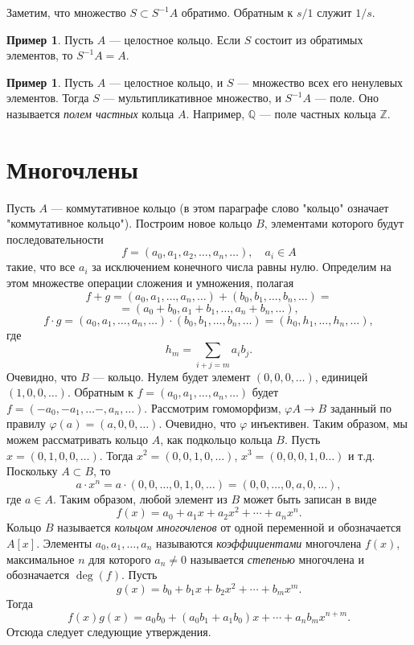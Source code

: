 \documentclass[12pt, titlepage, oneside]{amsbook}
\newcommand{\ZZ}{\mathbb{Z}}
\newcommand{\QQ}{\mathbb{Q}}
\theoremstyle{definition}
\newtheorem{example}[theorem]{Пример}
\theoremstyle{remark}
\begin{document}
Заметим, что множество $S\subset S^{-1}A$ обратимо. Обратным к $s/1$ служит $1/s$.

\begin{example}
	Пусть $A$ --- целостное кольцо. Если $S$ состоит из обратимых элементов, то $S^{-1}A=A$.
\end{example}

\begin{example}
	Пусть $A$ --- целостное кольцо, и $S$ --- множество всех его ненулевых элементов. Тогда $S$ --- мультипликативное множество, и $S^{-1}A$ --- поле. Оно называется \emph{полем частных} кольца $A$. Например, $\QQ$ --- поле частных кольца $\ZZ$.
\end{example}

\section{Многочлены}

Пусть $A$ --- коммутативное кольцо (в этом параграфе слово "кольцо" означает "коммутативное кольцо"). Построим новое кольцо $B$, элементами которого будут последовательности $$f=(a_0,a_1,a_2,\ldots,a_n,\ldots),\quad a_i\in A$$ такие, что все $a_i$ за исключением конечного числа равны нулю. Определим на этом множестве операции сложения и умножения, полагая $$f+g=(a_0,a_1,\ldots,a_n,\ldots)+(b_0,b_1,\ldots,b_n,\ldots)=$$ $$=(a_0+b_0,a_1+b_1,\ldots,a_n+b_n,\ldots),$$ $$f\cdot g=(a_0,a_1,\ldots,a_n,\ldots)\cdot(b_0,b_1,\ldots,b_n,\ldots)=(h_0,h_1,\ldots,h_n,\ldots),$$ где $$h_m=\sum\limits_{i+j=m}a_ib_j.$$ Очевидно, что $B$ --- кольцо. Нулем будет элемент $(0,0,0,\ldots)$, единицей $(1,0,0,\ldots)$. Обратным к $f=(a_0,a_1,\ldots,a_n,\ldots)$ будет $f=(-a_0,-a_1,\ldots-,a_n,\ldots)$. Рассмотрим гомоморфизм, $\varphi A\rightarrow B$ заданный по правилу $\varphi(a)=(a,0,0,\ldots)$. Очевидно, что $\varphi$ инъективен. Таким образом, мы можем рассматривать кольцо $A$, как подкольцо кольца $B$. Пусть $x=(0,1,0,0,\ldots)$. Тогда $x^2=(0,0,1,0,\ldots)$, $x^3=(0,0,0,1,0\ldots)$ и т.д. Поскольку $A\subset B$, то $$a\cdot x^n=a\cdot(0,0,\ldots,0,1,0,\ldots)=(0,0,\ldots,0,a,0,\ldots),$$ где $a\in A$. Таким образом, любой элемент из $B$ может быть записан в виде
$$f(x)=a_0+a_1x+a_2x^2+\cdots+a_n x^n.$$ Кольцо $B$ называется \emph{кольцом многочленов} от одной переменной и обозначается $A[x]$. Элементы $a_0,a_1,\ldots,a_n$ называются \emph{коэффициентами} многочлена $f(x)$, максимальное $n$ для которого $a_n\neq 0$ называется \emph{степенью} многочлена и обозначается $\deg(f)$. Пусть $$g(x)=b_0+b_1x+b_2x^2+\cdots+b_m x^m.$$ Тогда $$f(x)g(x)=a_0b_0+(a_0b_1+a_1b_0)x+\cdots+a_nb_mx^{n+m}.$$ Отсюда следует следующие утверждения.
\end{document}
